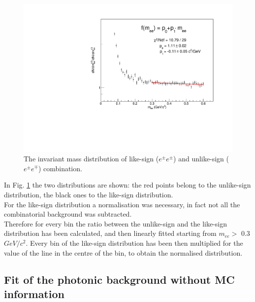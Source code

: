 \documentclass[a4paper,twocolumn,gsifonts,twoside]{gsipaper}
\begin{document}
\begin{figure}[htb]
\center
\includegraphics[scale = 0.4]{USLS_ratio.pdf}
\caption{The invariant mass distribution of like-sign ($e^{\pm}e^{\pm}$) and unlike-sign ($e^{\pm}e^{\mp}$) combination.}
\label{LSUS}
\end{figure}

In Fig. \ref{LSUS} the two distributions are shown: the red points belong to the 
unlike-sign distribution, the black ones to the like-sign distribution.\\
For the like-sign distribution a normalisation was necessary, in fact not all the combinatorial background was subtracted.\\

Therefore for every bin the ratio between the unlike-sign and the like-sign distribution has been calculated, and then linearly fitted 
starting from $m_{ee} >$ 0.3 $GeV/c^{2}$.
Every bin of the like-sign distribution has been then multiplied for the value of the line in the centre of the bin, to obtain the 
normalised distribution.\\

\subsection{Fit of the photonic background without MC information}
\end{document}
